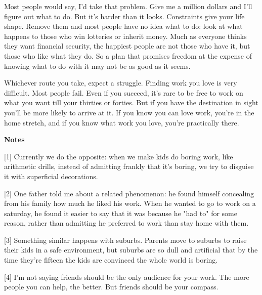 Most people would say, I'd take that
                  problem. Give me a million dollars and I'll figure out what to
                  do. But it's harder than it looks. Constraints give your life
                  shape. Remove them and most people have no idea what to do:
                  look at what happens to those who win lotteries or inherit
                  money. Much as everyone thinks they want financial security,
                  the happiest people are not those who have it, but those who
                  like what they do. So a plan that promises freedom at the
                  expense of knowing what to do with it may not be as good as it
                  seems.

Whichever route you take, expect a struggle.
                  Finding work you love is very difficult. Most people fail.
                  Even if you succeed, it's rare to be free to work on what you
                  want till your thirties or forties. But if you have the
                  destination in sight you'll be more likely to arrive at it. If
                  you know you can love work, you're in the home stretch, and if
                  you know what work you love, you're practically there.







\textbf{Notes}

[1] Currently we do the opposite: when we make kids do boring
                  work, like arithmetic drills, instead of admitting frankly
                  that it's boring, we try to disguise it with superficial
                  decorations.

[2] One father told me about a related phenomenon: he found
                  himself concealing from his family how much he liked his work.
                  When he wanted to go to work on a saturday, he found it easier
                  to say that it was because he "had to" for some reason, rather
                  than admitting he preferred to work than stay home with
                  them.

[3] Something similar happens with suburbs. Parents move to
                  suburbs to raise their kids in a safe environment, but suburbs
                  are so dull and artificial that by the time they're fifteen
                  the kids are convinced the whole world is boring.

[4] I'm not saying friends should be the only audience for your
                  work. The more people you can help, the better. But friends
                  should be your compass.

